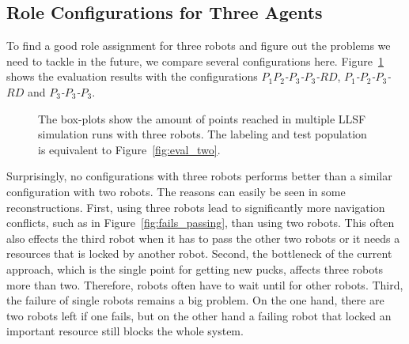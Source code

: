 \subsection{Role Configurations for Three Agents}
To find a good role assignment for three robots and figure out the problems we need to tackle in the future, we compare several configurations here. Figure~\ref{fig:eval_three} shows the evaluation results with the configurations \textit{$P_1P_2$-$P_3$-$P_3$-$RD$}, \textit{$P_1$-$P_2$-$P_3$-$RD$} and \textit{$P_3$-$P_3$-$P_3$}.
\begin{figure}
  \centering
  \caption{The box-plots show the amount of points reached in multiple LLSF simulation runs with three robots. The labeling and test population is equivalent to Figure~\ref{fig:eval_two}.}
  \label{fig:eval_three}
\end{figure}
Surprisingly, no configurations with three robots performs better than a similar configuration with two robots. The reasons can easily be seen in some reconstructions. First, using three robots lead to significantly more navigation conflicts, such as in Figure~\ref{fig:fails_passing}, than using two robots. This often also effects the third robot when it has to pass the other two robots or it needs a resources that is locked by another robot. Second, the bottleneck of the current approach, which is the single point for getting new pucks, affects three robots more than two. Therefore, robots often have to wait until for other robots. Third, the failure of single robots remains a big problem. On the one hand, there are two robots left if one fails, but on the other hand a failing robot that locked an important resource still blocks the whole system.



